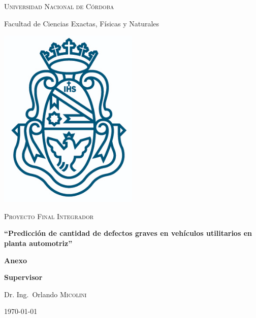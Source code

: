 \documentclass[a4paper,12pt]{article}
\author{Gerardo A. COLLANTE \\ Matrícula: 39.022.782 \\ Email: \href{mailto:gerardo.collante@unc.edu.ar}{gerardo.collante@unc.edu.ar} \\ Cel: 54 (03574) 650490}
\begin{document}
\makeatletter
\begin{titlepage}
	
	{\scshape\LARGE Universidad Nacional de Córdoba \par}
	{\Large Facultad de Ciencias Exactas, Físicas y Naturales \par}
	\vspace{0.5cm}
	\centering
	\includegraphics[width=0.5\textwidth]{unc.png}
	\par\vspace{0.5cm}
	\vspace{0.5cm}
	{\scshape\Large Proyecto Final Integrador\par}
	\vspace{1cm}
	{\large\bfseries ``Predicción de cantidad de defectos graves en vehículos utilitarios en planta automotriz'' \par}
	\vspace{0.5cm}
	
	\textbf{Anexo}
	\vspace{0.5cm}
	
	\normalsize\@author\space
	
	
	\vspace{0.5cm}
	\textbf{Supervisor}\par
	Dr. Ing.~Orlando \textsc{Micolini}

	\vfill

	{\large \today\par}
\end{titlepage}

\tableofcontents

\clearpage
\end{document}

